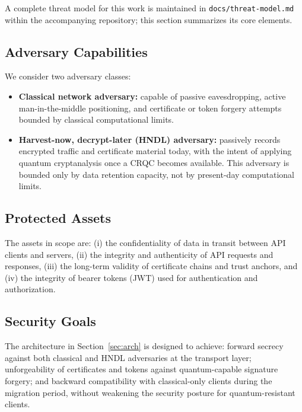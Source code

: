 \documentclass[conference]{IEEEtran}
\begin{document}
A complete threat model for this work is maintained in
\texttt{docs/threat-model.md} within the accompanying repository; this
section summarizes its core elements.

\subsection{Adversary Capabilities}

We consider two adversary classes:

\begin{itemize}
  \item \textbf{Classical network adversary:} capable of passive
        eavesdropping, active man-in-the-middle positioning, and
        certificate or token forgery attempts bounded by classical
        computational limits.
  \item \textbf{Harvest-now, decrypt-later (HNDL) adversary:} passively
        records encrypted traffic and certificate material today, with the
        intent of applying quantum cryptanalysis once a CRQC becomes
        available. This adversary is bounded only by data retention
        capacity, not by present-day computational limits.
\end{itemize}

\subsection{Protected Assets}

The assets in scope are: (i) the confidentiality of data in transit between
API clients and servers, (ii) the integrity and authenticity of API
requests and responses, (iii) the long-term validity of certificate chains
and trust anchors, and (iv) the integrity of bearer tokens (JWT) used for
authentication and authorization.

\subsection{Security Goals}

The architecture in Section~\ref{sec:arch} is designed to achieve: forward
secrecy against both classical and HNDL adversaries at the transport layer;
unforgeability of certificates and tokens against quantum-capable
signature forgery; and backward compatibility with classical-only clients
during the migration period, without weakening the security posture for
quantum-resistant clients.

\end{document}

